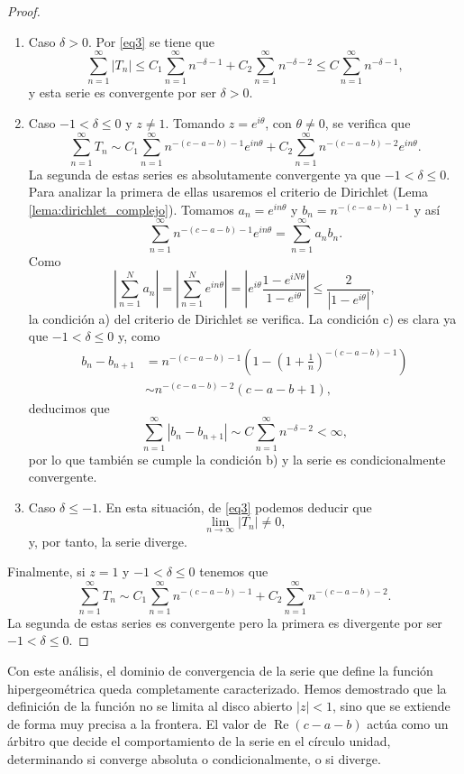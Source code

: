 \documentclass[12pt,a4paper]{book}
\renewcommand{\Re}{\operatorname{Re}}
\begin{document}
\begin{proof}
\begin{enumerate}[label=\alph*)]
    \item Caso $\delta > 0$. Por \eqref{eq3} se tiene que
    \[
    \sum_{n=1}^\infty |T_n| \leq C_1 \sum_{n=1}^\infty n^{-\delta-1} +C_2\sum_{n=1}^\infty n^{-\delta-2} \le C\sum_{n=1}^\infty n^{-\delta -1},
    \]
    y esta serie es convergente por ser $\delta >0$.
    \item Caso $-1 < \delta \leq 0$ y $z \neq 1$. Tomando $z = e^{i\theta}$, con $\theta \neq 0$, se verifica que 
    \[
    \sum_{n=1}^\infty T_n \sim C_1 \sum_{n=1}^\infty n^{-(c-a-b)-1} e^{in\theta} + C_2 \sum_{n=1}^\infty n^{-(c-a-b)-2} e^{in\theta}.
    \]
    La segunda de estas series es absolutamente convergente ya que $-1 < \delta \leq 0$. Para analizar la primera de ellas usaremos el criterio de Dirichlet (Lema \ref{lema:dirichlet_complejo}). Tomamos $a_n = e^{in\theta}$ y $b_n = n^{-(c-a-b)-1}$ y así
    \[
    \sum_{n=1}^\infty n^{-(c-a-b)-1} e^{in\theta} = \sum_{n=1}^\infty a_n b_n.
    \]
    Como 
    \[
    \left|\sum_{n=1}^N a_n \right|=\left|\sum_{n=1}^N e^{in\theta}\right|= \left|e^{i\theta}\frac{1-e^{iN\theta}}{1-e^{i\theta}}\right| \le \frac{2}{|1-e^{i\theta}|},
    \]
    la condición a) del criterio de Dirichlet se verifica. La condición c) es clara ya que $-1 < \delta \le 0$ y, como
    \begin{align*}
      b_n - b_{n+1} &= n^{-(c-a-b)-1}\left(1 - \left( 1 + \frac{1}{n}\right)^{-(c-a-b)-1}\right) \\ &\sim n^{-(c-a-b)-2}(c-a-b+1),  
    \end{align*}
    deducimos que
    \[
    \sum_{n=1}^\infty |b_n - b_{n+1}| \sim C \sum_{n=1}^\infty n^{-\delta-2} < \infty,
    \]
    por lo que también se cumple la condición b) y la serie es condicionalmente convergente.
    \item Caso $\delta \leq -1$. En esta situación, de \eqref{eq3} podemos deducir que
    \[
    \lim_{n \to \infty} |T_n| \neq 0,
    \]
    y, por tanto, la serie diverge.
\end{enumerate}
Finalmente, si $z=1$ y $-1 < \delta \le 0$ tenemos que 
\[
\sum_{n=1}^\infty T_n \sim C_1 \sum_{n=1}^\infty n^{-(c-a-b)-1} + C_2 \sum_{n=1}^\infty n^{-(c-a-b)-2}.
\]
La segunda de estas series es convergente pero la primera es divergente por ser $-1 < \delta \le 0$.
\end{proof}

Con este análisis, el dominio de convergencia de la serie que define la función hipergeométrica queda completamente caracterizado. Hemos demostrado que la definición de la función no se limita al disco abierto $|z|<1$, sino que se extiende de forma muy precisa a la frontera. El valor de $\Re(c-a-b)$ actúa como un árbitro que decide el comportamiento de la serie en el círculo unidad, determinando si converge absoluta o condicionalmente, o si diverge.
\end{document}
